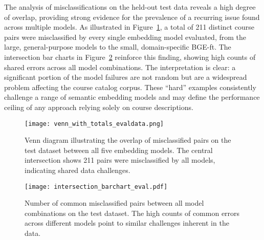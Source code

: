The analysis of misclassifications on the held-out test data reveals a high degree of overlap, providing strong evidence for the prevalence of a recurring issue found across multiple models. As illustrated in Figure~\ref{fig:venn_misclassified}, a total of 211 distinct course pairs were misclassified by every single embedding model evaluated, from the large, general-purpose models to the small, domain-specific BGE-ft. The intersection bar charts in Figure~\ref{fig:intersection_barchart} reinforce this finding, showing high counts of shared errors across all model combinations. The interpretation is clear: a significant portion of the model failures are not random but are a widespread problem affecting the course catalog corpus. These ``hard'' examples consistently challenge a range of semantic embedding models and may define the performance ceiling of any approach relying solely on course descriptions.
\begin{figure}[tb]
    \captionsetup{skip=5pt}
\centering
\texttt{[image: venn\_with\_totals\_evaldata.png]}
\caption{Venn diagram illustrating the overlap of misclassified pairs on the test dataset between all five embedding models. The central intersection shows 211 pairs were misclassified by all models, indicating shared data challenges.}
\label{fig:venn_misclassified}
\end{figure}
\begin{figure}[tb]
    \captionsetup{skip=5pt}
\centering
\texttt{[image: intersection\_barchart\_eval.pdf]}
\caption{Number of common misclassified pairs between all model combinations on the test dataset. The high counts of common errors across different models point to similar challenges inherent in the data.}
\label{fig:intersection_barchart}
\end{figure}

